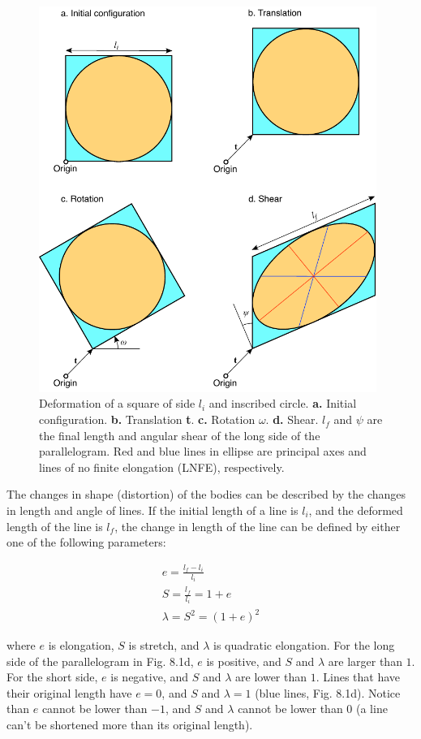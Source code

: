 \documentclass[a4paper , 12pt]{book}
\begin{document}
\begin{figure}[ht]
    \centering
    \includegraphics[width=11cm]{ch8f1.pdf}
    \caption{Deformation of a square of side $l_i$ and inscribed circle. \textbf{a.} Initial configuration. \textbf{b.} Translation \textbf{t}. \textbf{c.} Rotation $\omega$. \textbf{d.} Shear. $l_f$ and $\psi$ are the final length and angular shear of the long side of the parallelogram. Red and blue lines in ellipse are principal axes and lines of no finite elongation (LNFE), respectively.}
\end{figure}

The changes in shape (distortion) of the bodies can be described by the changes in length and angle of lines. If the initial length of a line is $l_i$, and the deformed length of the line is $l_f$, the change in length of the line can be defined by either one of the following parameters:

\begin{equation}
    \begin{gathered}
        e = \frac{l_f-l_i}{l_i} \\
        S = \frac{l_f}{l_i} = 1 + e \\
        \lambda = S^2 = (1+e)^2
    \end{gathered}
\end{equation}

where $e$ is elongation, $S$ is stretch, and $\lambda$ is quadratic elongation. For the long side of the parallelogram in Fig. 8.1d, $e$ is positive, and $S$ and $\lambda$ are larger than $1$. For the short side, $e$ is negative, and $S$ and $\lambda$ are lower than $1$. Lines that have their original length have $e = 0$, and $S$ and $\lambda = 1$ (blue lines, Fig. 8.1d). Notice than $e$ cannot be lower than $-1$, and $S$ and $\lambda$ cannot be lower than 0 (a line can't be shortened more than its original length).
\end{document}
